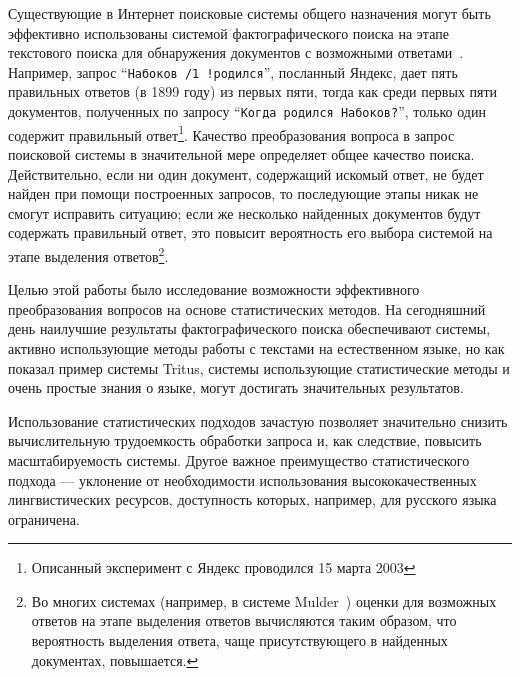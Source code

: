 \documentclass{article}
\newcommand{\query}[1]{``{\textrm{\tt #1}}''}
\begin{document}
Существующие в Интернет поисковые системы общего назначения могут быть
эффективно использованы системой фактографического поиска
на этапе текстового поиска для обнаружения
документов с возможными ответами~\cite{qa:radev:getting_answers}.
Например,
запрос \query{Набоков /1 !родился}, посланный Яндекс,
дает пять правильных ответов (в 1899 году) из первых пяти, 
тогда как среди первых пяти документов, полученных по запросу \query{Когда родился Набоков?},
только один содержит правильный 
ответ\footnote{Описанный эксперимент с Яндекс проводился 15
марта 2003}.
Качество преобразования вопроса в запрос поисковой системы
в значительной мере определяет общее качество поиска. %
Действительно, если ни один документ,
содержащий искомый ответ, не будет найден при помощи построенных запросов, 
то последующие этапы никак не смогут исправить ситуацию;
если же несколько найденных документов будут содержать правильный ответ,
это повысит вероятность его выбора системой на этапе выделения ответов\footnote{
Во многих системах (например, в системе Mulder~\cite{qa:Mulder})
оценки для возможных ответов на этапе выделения ответов
вычисляются таким образом, что вероятность
выделения ответа, чаще присутствующего в найденных документах, повышается.
}.


Целью этой работы было исследование возможности эффективного
преобразования вопросов на основе статистических методов. 
На сегодняшний день наилучшие результаты фактографического поиска обеспечивают
системы, активно использующие методы работы с текстами на естественном языке, 
но как показал пример системы Tritus\cite{qa:Tritus}, системы использующие 
статистические методы и очень простые знания о языке,
могут достигать значительных результатов.

Использование статистических подходов зачастую позволяет 
значительно снизить вычислительную
трудоемкость обработки запроса и, как следствие, повысить масштабируемость 
системы. Другое важное преимущество статистического подхода --- уклонение от 
необходимости использования высококачественных лингвистических ресурсов,
доступность которых, например, для русского языка ограничена.
\end{document}
